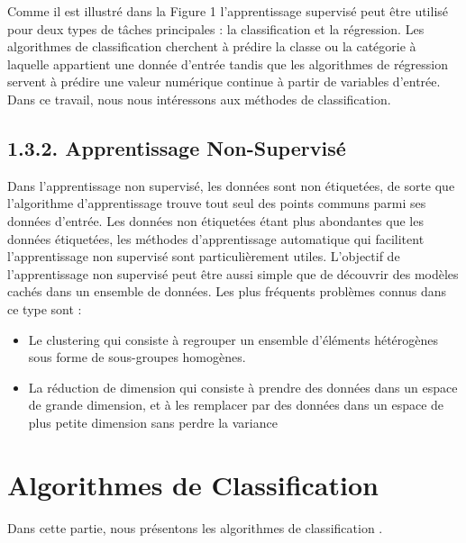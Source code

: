 Comme il est illustré dans la Figure 1 l’apprentissage supervisé peut être utilisé pour deux types de tâches principales : la classification et la régression. 
Les algorithmes de classification cherchent à prédire la classe ou la catégorie à laquelle appartient une donnée d'entrée tandis que les algorithmes de régression servent à prédire une valeur numérique continue à partir de variables d'entrée. Dans ce travail, nous nous intéressons aux méthodes de classification.
\subsection{1.3.2.	Apprentissage Non-Supervisé }
Dans l'apprentissage non supervisé, les données sont non étiquetées, de sorte que l'algorithme d'apprentissage trouve tout seul des points communs parmi ses données d'entrée. Les données non étiquetées étant plus abondantes que les données étiquetées, les méthodes d'apprentissage automatique qui facilitent l'apprentissage non supervisé sont particulièrement utiles.
L'objectif de l'apprentissage non supervisé peut être aussi simple que de découvrir des modèles cachés dans un ensemble de données.
Les plus fréquents problèmes connus dans ce type sont :
\begin{itemize}
    \item Le clustering qui consiste à regrouper un ensemble d’éléments hétérogènes sous forme de sous-groupes homogènes.
    \item La réduction de dimension qui consiste à prendre des données dans un espace de grande dimension, et à les remplacer par des données dans un espace de plus petite dimension sans perdre la variance \cite{2}
\end{itemize}
\section{Algorithmes de Classification }
Dans cette partie, nous présentons les algorithmes de classification \cite{3} \cite{4} \cite{5}.

